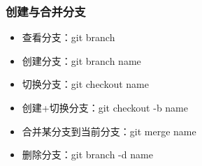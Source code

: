 \documentclass[notheorems,mathserif,table,compress]{beamer}  %
\begin{document}
\begin{frame}
  \frametitle{创建与合并分支}
  \begin{itemize}
  \item 查看分支：git branch
  \item 创建分支：git branch name
  \item 切换分支：git checkout name
  \item 创建+切换分支：git checkout -b name
  \item 合并某分支到当前分支：git merge name
  \item 删除分支：git branch -d name
  \end{itemize}
\end{frame}
\end{document}
